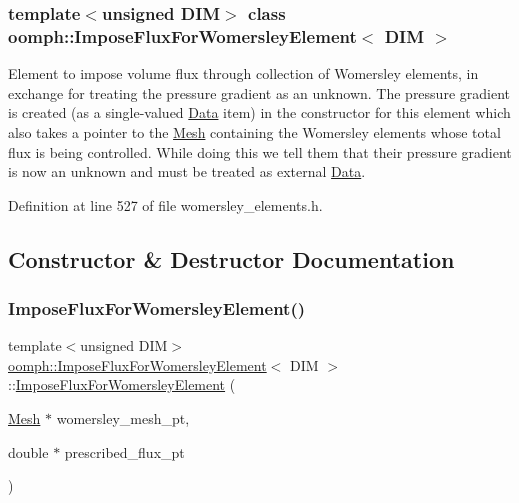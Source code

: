 \subsubsection*{template$<$unsigned D\+IM$>$\newline
class oomph\+::\+Impose\+Flux\+For\+Womersley\+Element$<$ D\+I\+M $>$}

Element to impose volume flux through collection of Womersley elements, in exchange for treating the pressure gradient as an unknown. The pressure gradient is created (as a single-\/valued \hyperlink{classoomph_1_1Data}{Data} item) in the constructor for this element which also takes a pointer to the \hyperlink{classoomph_1_1Mesh}{Mesh} containing the Womersley elements whose total flux is being controlled. While doing this we tell them that their pressure gradient is now an unknown and must be treated as external \hyperlink{classoomph_1_1Data}{Data}. 

Definition at line 527 of file womersley\+\_\+elements.\+h.



\subsection{Constructor \& Destructor Documentation}
\mbox{\label{classoomph_1_1ImposeFluxForWomersleyElement_ac7fc5594b9f38a3587f0cd798ff3dfb2}} 
\subsubsection{\texorpdfstring{Impose\+Flux\+For\+Womersley\+Element()}{ImposeFluxForWomersleyElement()}}
{\footnotesize\ttfamily template$<$unsigned D\+IM$>$ \\
\hyperlink{classoomph_1_1ImposeFluxForWomersleyElement}{oomph\+::\+Impose\+Flux\+For\+Womersley\+Element}$<$ D\+IM $>$\+::\hyperlink{classoomph_1_1ImposeFluxForWomersleyElement}{Impose\+Flux\+For\+Womersley\+Element} (\begin{DoxyParamCaption}\item[{\hyperlink{classoomph_1_1Mesh}{Mesh} $\ast$}]{womersley\+\_\+mesh\+\_\+pt,  }\item[{double $\ast$}]{prescribed\+\_\+flux\+\_\+pt }\end{DoxyParamCaption})\hspace{0.3cm}{\ttfamily [inline]}}



